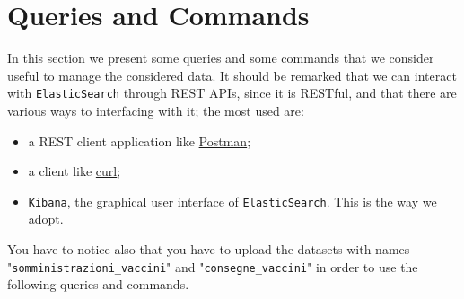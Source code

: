 \documentclass{article}
\begin{document}
\section{Queries and Commands}
In this section we present some queries and some commands that we consider useful to manage the considered data. It should be remarked that we can interact with \verb|ElasticSearch| through REST APIs, since it is RESTful, and that there are various ways to interfacing with it; the most used are:
\begin{itemize}
\item a REST client application like \href{https://www.postman.com}{Postman};
    \item a client like \href{https://curl.se
}{curl};
\item \verb|Kibana|, the graphical user interface of \verb|ElasticSearch|. This is the way we adopt.
\end{itemize}
You have to notice also that you have to upload the datasets with names "\verb|somministrazioni_vaccini|" and "\verb|consegne_vaccini|" in order to use the following queries and commands.
\end{document}
